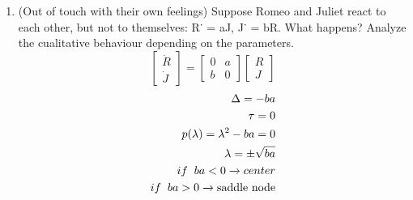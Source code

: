 \documentclass[a4paper,10pt]{article}
\begin{document}
\begin{enumerate}
    \item (Out of touch with their own feelings) Suppose Romeo and Juliet react to each other, but not to themselves: R˙ = aJ, J˙ = bR. What happens? Analyze the cualitative behaviour depending on the parameters.
        \begin{equation}
            \begin{bmatrix}
                \dot{R}\\
                \dot{J}
            \end{bmatrix}
            = 
            \begin{bmatrix}
                0 & a\\
                b &0
            \end{bmatrix}
            \begin{bmatrix}
                R\\
                J
            \end{bmatrix}
        \end{equation}
        \begin{equation}
            \begin{aligned}
                \Delta= -ba\\
                \tau=0\\
                p(\lambda)= \lambda^{2}-ba=0\\
                \lambda= \pm \sqrt{ba}\\
                if \hspace{0.2cm} ba<0 \xrightarrow{} center\\
                if \hspace{0.2cm} ba>0 \xrightarrow{} \text{saddle node}
            \end{aligned}
        \end{equation}
    







\end{enumerate}
\end{document}
